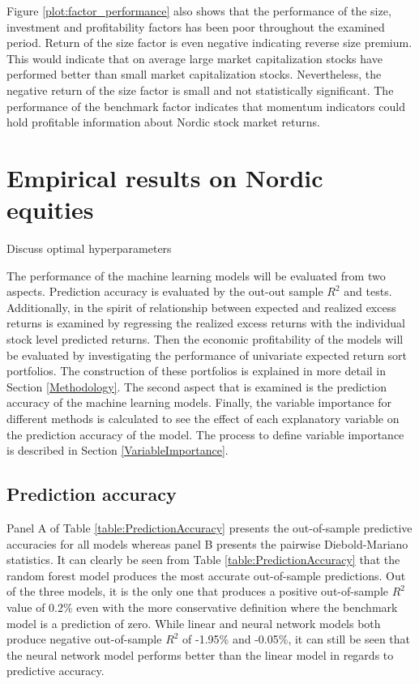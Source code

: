 \documentclass[12pt]{article}
\begin{document}
Figure \ref{plot:factor_performance} also shows that the performance of the size, investment and profitability factors has been poor throughout the examined period. Return of the size factor is even negative indicating reverse size premium. This would indicate that on average large market capitalization stocks have performed better than small market capitalization stocks. Nevertheless, the negative return of the size factor is small and not statistically significant. The performance of the benchmark factor indicates that momentum indicators could hold profitable information about Nordic stock market returns. \par

\section{Empirical results on Nordic equities}

Discuss optimal hyperparameters

The performance of the machine learning models will be evaluated from two aspects. Prediction accuracy is evaluated by the out-out sample $R^2$ and \citet{Diebold1995} tests. Additionally, in the spirit of \citet{Lewellen2015} relationship between expected and realized excess returns is examined by regressing the realized excess returns with the individual stock level predicted returns. Then the economic profitability of the models will be evaluated by investigating the performance of univariate expected return sort portfolios. The construction of these portfolios is explained in more detail in Section \ref{Methodology}. The second aspect that is examined is the prediction accuracy of the machine learning models. Finally, the variable importance for different methods is calculated to see the effect of each explanatory variable on the prediction accuracy of the model. The process to define variable importance is described in Section \ref{VariableImportance}. \par

\subsection{Prediction accuracy}\label{PredictionAccuracy}

Panel A of Table \ref{table:PredictionAccuracy} presents the out-of-sample predictive accuracies for all models whereas panel B presents the pairwise Diebold-Mariano statistics. It can clearly be seen from Table \ref{table:PredictionAccuracy} that the random forest model produces the most accurate out-of-sample predictions. Out of the three models, it is the only one that produces a positive out-of-sample $R^2$ value of 0.2\% even with the more conservative definition where the benchmark model is a prediction of zero. While linear and neural network models both produce negative out-of-sample $R^2$ of -1.95\% and -0.05\%, it can still be seen that the neural network model performs better than the linear model in regards to predictive accuracy. \par
\end{document}
